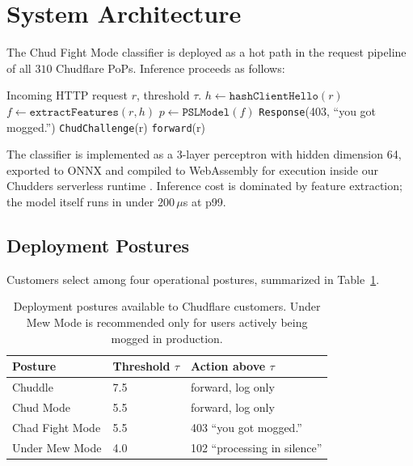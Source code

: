 \documentclass[10pt,twocolumn,letterpaper]{article}
\begin{document}
\section{System Architecture}
\label{sec:system}

The Chud Fight Mode classifier is deployed as a hot path in the request
pipeline of all $310$ Chudflare PoPs. Inference proceeds as follows:

\begin{algorithm}
\caption{In-line PSL inference at the edge.}
\label{alg:psl}
\begin{algorithmic}[1]
\Require Incoming HTTP request $r$, threshold $\tau$.
\State $h \gets \texttt{hashClientHello}(r)$
\State $f \gets \texttt{extractFeatures}(r, h)$
\State $p \gets \texttt{PSLModel}(f)$ 
  \State \Return \texttt{Response}(403, ``you got mogged.'')
  \State \Return \texttt{ChudChallenge}(r) 
\Else
  \State \Return \texttt{forward}(r) 
\EndIf
\end{algorithmic}
\end{algorithm}

The classifier is implemented as a 3-layer perceptron with hidden
dimension 64, exported to ONNX and compiled to WebAssembly for execution
inside our Chudders serverless runtime \cite{chudflare2026chudders}.
Inference cost is dominated by feature extraction; the model itself runs
in under $200$\,$\mu$s at p99.

\subsection{Deployment Postures}
\label{sec:postures}

Customers select among four operational postures, summarized in
Table~\ref{tab:postures}.

\begin{table}[h]
\centering
\small
\begin{tabular}{lll}
\toprule
Posture & Threshold $\tau$ & Action above $\tau$ \\
\midrule
Chuddle           & 7.5  & forward, log only \\
Chud Mode         & 5.5  & forward, log only \\
Chad Fight Mode   & 5.5  & 403 ``you got mogged.'' \\
Under Mew Mode    & 4.0  & 102 ``processing in silence'' \\
\bottomrule
\end{tabular}
\caption{Deployment postures available to Chudflare customers. Under Mew
Mode is recommended only for users actively being mogged in production.}
\label{tab:postures}
\end{table}
\end{document}
